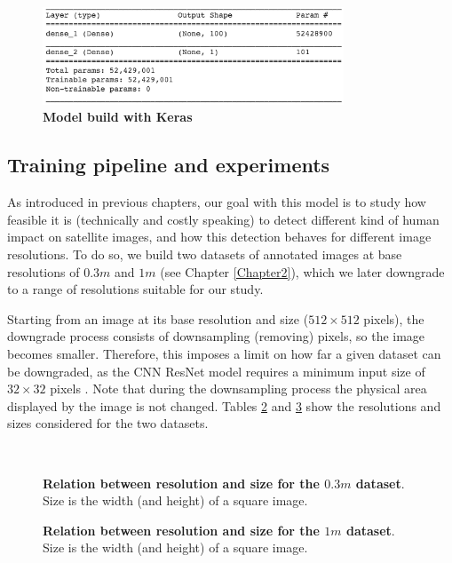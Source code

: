 \begin{figure}[h!]
	\centering
	\includegraphics[width=0.8\textwidth]{Figures/model_keras.png}
	\captionsetup{width=1\linewidth}
	\caption{\textbf{Model build with Keras}}
	\label{fig:model_keras}
\end{figure}


\subsection{Training pipeline and experiments}

As introduced in previous chapters, our goal with this model is to study how feasible it is (technically and costly speaking) to detect different kind of human impact on satellite images, and how this detection behaves for different image resolutions. To do so, we build two datasets of annotated images at base resolutions of $0.3m$ and $1m$ (see Chapter \ref{Chapter2}), which we later downgrade to a range of resolutions suitable for our study.

Starting from an image at its base resolution and size ($512\times512$ pixels), the downgrade process consists of downsampling (removing) pixels, so the image becomes smaller. Therefore, this imposes a limit on how far a given dataset can be downgraded, as the CNN ResNet model requires a minimum input size of $32\times32$ pixels \parencite{ResNetKeras}. Note that during the downsampling process the physical area displayed by the image is not changed. Tables \ref{tab:resolutions_03m} and \ref{tab:resolutions_1m} show the resolutions and sizes considered for the two datasets.

\

\begin{figure}[h!]
	\centering
	
	\captionsetup{width=1\linewidth}
	\caption{\textbf{Relation between resolution and size for the $0.3m$ dataset}. Size is the width (and height) of a square image.}
	\label{tab:resolutions_03m}
\end{figure}

\begin{figure}[h!]
	\centering
	
	\captionsetup{width=1\linewidth}
	\caption{\textbf{Relation between resolution and size for the $1m$ dataset}. Size is the width (and height) of a square image.}
	\label{tab:resolutions_1m}
\end{figure}

